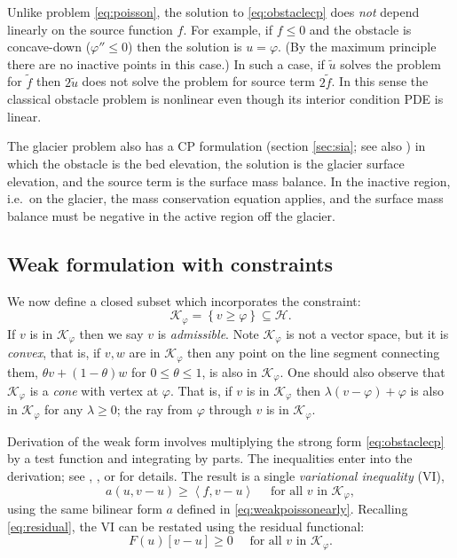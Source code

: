 \documentclass[letterpaper,final,12pt,reqno]{amsart}
\theoremstyle{claim}
\newcommand{\ip}[2]{\left<#1,#2\right>}
\numberwithin{equation}{section}
\numberwithin{figure}{section}
\numberwithin{table}{section}
\numberwithin{theorem}{section}
\begin{document}
Unlike problem \eqref{eq:poisson}, the solution to \eqref{eq:obstaclecp} does \emph{not} depend linearly on the source function $f$.  For example, if $f \le 0$ and the obstacle is concave-down ($\varphi'' \le 0$) then the solution is $u=\varphi$.  (By the maximum principle \cite{Evans2010} there are no inactive points in this case.)  In such a case, if $\tilde u$ solves the problem for $\tilde f$ then $2\tilde u$ does not solve the problem for source term $2\tilde f$.  In this sense the classical obstacle problem is nonlinear even though its interior condition PDE is linear.

The glacier problem also has a CP formulation (section \ref{sec:sia}; see also \cite{Calvoetal2002}) in which the obstacle is the bed elevation, the solution is the glacier surface elevation, and the source term is the surface mass balance.  In the inactive region, i.e.~on the glacier, the mass conservation equation applies, and the surface mass balance must be negative in the active region off the glacier.

\subsection{Weak formulation with constraints} \label{subsec:obstacleweak}  We now define a closed subset which incorporates the constraint:
\begin{equation}
\mathcal{K}_\varphi = \left\{v \ge \varphi\right\} \subseteq \mathcal{H}.  \label{eq:Kdefine}
\end{equation}
If $v$ is in $\mathcal{K}_\varphi$ then we say $v$ is \emph{admissible}.  Note $\mathcal{K}_\varphi$ is not a vector space, but it is \emph{convex}, that is, if $v,w$ are in $\mathcal{K}_\varphi$ then any point on the line segment connecting them, $\theta v + (1-\theta) w$ for $0 \le \theta \le 1$, is also in $\mathcal{K}_\varphi$.  One should also observe that $\mathcal{K}_\varphi$ is a \emph{cone} with vertex at $\varphi$.  That is, if $v$ is in $\mathcal{K}_\varphi$ then $\lambda(v-\varphi) + \varphi$ is also in $\mathcal{K}_\varphi$ for any $\lambda \ge 0$; the ray from $\varphi$ through $v$ is in $\mathcal{K}_\varphi$.

Derivation of the weak form involves multiplying the strong form \eqref{eq:obstaclecp} by a test function and integrating by parts.  The inequalities enter into the derivation; see \cite[Chapter 12]{Bueler2021}, \cite{JouvetBueler2012}, or \cite{KinderlehrerStampacchia1980} for details.  The result is a single \emph{variational inequality} (VI),
\begin{equation}
  a(u,v-u) \ge \ip{f}{v-u} \quad \text{ for all } v \text{ in } \mathcal{K}_\varphi, \label{eq:obstaclevi}
\end{equation}
using the same bilinear form $a$ defined in \eqref{eq:weakpoissonearly}.  Recalling \eqref{eq:residual}, the VI can be restated using the residual functional:
\begin{equation}
  F(u)[v-u] \ge 0 \quad \text{ for all } v \text{ in } \mathcal{K}_\varphi. \label{eq:obstacleviresidual}
\end{equation}
\end{document}
